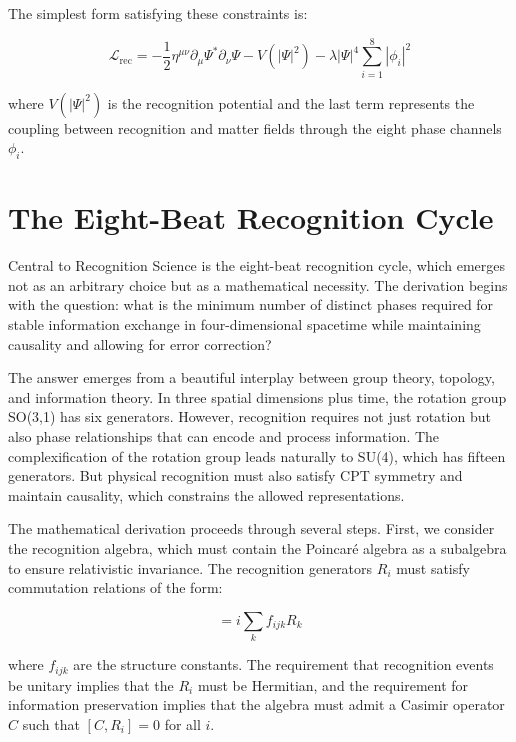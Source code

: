 \documentclass[12pt,a4paper]{report}
\begin{document}
The simplest form satisfying these constraints is:

\begin{equation}
\mathcal{L}_{\text{rec}} = -\frac{1}{2} \eta^{\mu\nu} \partial_\mu \Psi^* \partial_\nu \Psi - V(|\Psi|^2) - \lambda |\Psi|^4 \sum_{i=1}^{8} |\phi_i|^2
\end{equation}

where $V(|\Psi|^2)$ is the recognition potential and the last term represents the coupling between recognition and matter fields through the eight phase channels $\phi_i$.

\section{The Eight-Beat Recognition Cycle}

Central to Recognition Science is the eight-beat recognition cycle, which emerges not as an arbitrary choice but as a mathematical necessity. The derivation begins with the question: what is the minimum number of distinct phases required for stable information exchange in four-dimensional spacetime while maintaining causality and allowing for error correction?

The answer emerges from a beautiful interplay between group theory, topology, and information theory. In three spatial dimensions plus time, the rotation group SO(3,1) has six generators. However, recognition requires not just rotation but also phase relationships that can encode and process information. The complexification of the rotation group leads naturally to SU(4), which has fifteen generators. But physical recognition must also satisfy CPT symmetry and maintain causality, which constrains the allowed representations.

The mathematical derivation proceeds through several steps. First, we consider the recognition algebra, which must contain the Poincaré algebra as a subalgebra to ensure relativistic invariance. The recognition generators $R_i$ must satisfy commutation relations of the form:

\begin{equation}
[R_i, R_j] = i \sum_{k} f_{ijk} R_k
\end{equation}

where $f_{ijk}$ are the structure constants. The requirement that recognition events be unitary implies that the $R_i$ must be Hermitian, and the requirement for information preservation implies that the algebra must admit a Casimir operator $C$ such that $[C, R_i] = 0$ for all $i$.
\end{document}
